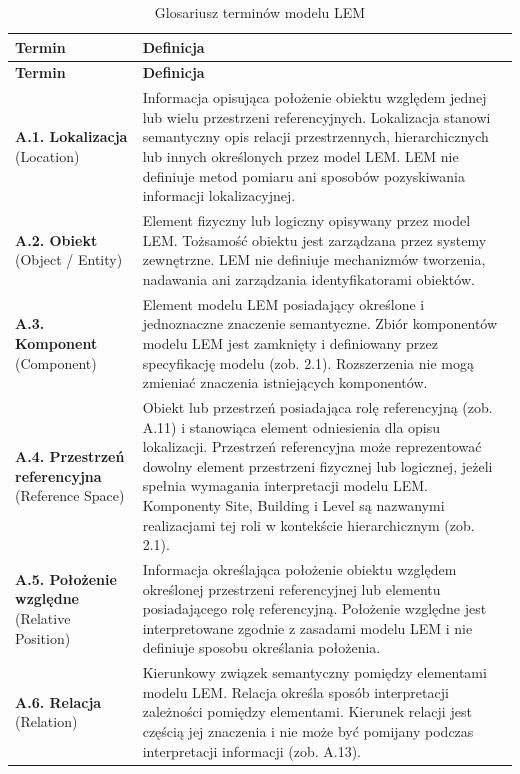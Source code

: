 \footnotesize
\setlength{\tabcolsep}{4pt}
\renewcommand{\arraystretch}{1.3}
\begin{longtable}{|p{}|p{}|}
\caption{Glosariusz terminów modelu LEM}\label{tab:glossary}\\
\hline
\textbf{Termin} & \textbf{Definicja} \\ \hline
\endfirsthead
\hline
\textbf{Termin} & \textbf{Definicja} \\ \hline
\endhead
\textbf{A.1. Lokalizacja} \newline (Location) & Informacja opisująca położenie obiektu względem jednej lub wielu przestrzeni referencyjnych. Lokalizacja stanowi semantyczny opis relacji przestrzennych, hierarchicznych lub innych określonych przez model LEM. LEM nie definiuje metod pomiaru ani sposobów pozyskiwania informacji lokalizacyjnej. \\ \hline
\textbf{A.2. Obiekt} \newline (Object / Entity) & Element fizyczny lub logiczny opisywany przez model LEM. Tożsamość obiektu jest zarządzana przez systemy zewnętrzne. LEM nie definiuje mechanizmów tworzenia, nadawania ani zarządzania identyfikatorami obiektów. \\ \hline
\textbf{A.3. Komponent} \newline (Component) & Element modelu LEM posiadający określone i jednoznaczne znaczenie semantyczne. Zbiór komponentów modelu LEM jest zamknięty i definiowany przez specyfikację modelu (zob. 2.1). Rozszerzenia nie mogą zmieniać znaczenia istniejących komponentów. \\ \hline
\textbf{A.4. Przestrzeń referencyjna} \newline (Reference Space) & Obiekt lub przestrzeń posiadająca rolę referencyjną (zob. A.11) i stanowiąca element odniesienia dla opisu lokalizacji. Przestrzeń referencyjna może reprezentować dowolny element przestrzeni fizycznej lub logicznej, jeżeli spełnia wymagania interpretacji modelu LEM. Komponenty Site, Building i Level są nazwanymi realizacjami tej roli w kontekście hierarchicznym (zob. 2.1). \\ \hline
\textbf{A.5. Położenie względne} \newline (Relative Position) & Informacja określająca położenie obiektu względem określonej przestrzeni referencyjnej lub elementu posiadającego rolę referencyjną. Położenie względne jest interpretowane zgodnie z zasadami modelu LEM i nie definiuje sposobu określania położenia. \\ \hline
\textbf{A.6. Relacja} \newline (Relation) & Kierunkowy związek semantyczny pomiędzy elementami modelu LEM. Relacja określa sposób interpretacji zależności pomiędzy elementami. Kierunek relacji jest częścią jej znaczenia i nie może być pomijany podczas interpretacji informacji (zob. A.13). \\ \hline

\end{longtable}

